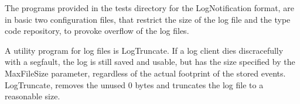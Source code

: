 The programs provided in the tests directory for the LogNotification
format, are in basic two configuration files, that restrict the size
of the log file and the type code repository, to provoke overflow of
the log files. 

A utility program for log files is LogTruncate. If a log client dies
discracefully with a segfault, the log is still saved and usable, but
has the size specified by the MaxFileSize parameter, regardless of the
actual footprint of the stored events. LogTruncate, removes the unused
0 bytes and truncates the log file to a reasonable size.

